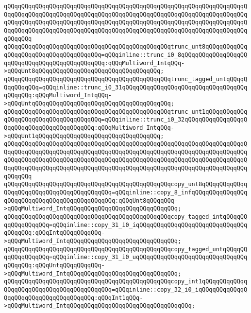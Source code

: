\verb|qQQqqQQqqQQqqQQqqQQqqQQqqQQqqQQqqQQqqQQqqQQqqQQqqQQqqQQqqQQqqQQqqQQqqQQqqQQqqQQqqQQqqQQqqQQqqQQqqQQqqQQqqQQqqQQqqQQqqQQqqQQqqQQqqQQqqQQqqQQqqQQqqQQqqQQqqQQqqQQqqQQqqQQqqQQqqQQqqQQqqQQqqQQqqQQqqQQqqQQqqQQqqQQqqQQqqQQqqQQqqQQqqQQqqQQqqQQqqQQqqQQqqQQqqQQqqQQqqQQqqQQqqQQqqQQqqQQqqQQqqQQqqQQq|\newline
\verb|qQQqqQQqqQQqqQQqqQQqqQQqqQQqqQQqqQQqqQQqqQQqqQQqtrunc_unt8qQQqqQQqqQQqqQQqqQQqqQQqqQQqqQQqqQQqqQQq=qQQqinline::trunc_i0_8qQQqqQQqqQQqqQQqqQQqqQQqqQQqqQQqqQQqqQQqqQQqqQQq:qQQqMultiword_IntqQQq->qQQqUnt8qQQqqQQqqQQqqQQqqQQqqQQqqQQqqQQqqQQq;|\newline
\verb|qQQqqQQqqQQqqQQqqQQqqQQqqQQqqQQqqQQqqQQqqQQqqQQqtrunc_tagged_untqQQqqQQqqQQqqQQq=qQQqinline::trunc_i0_31qQQqqQQqqQQqqQQqqQQqqQQqqQQqqQQqqQQqqQQqqQQq:qQQqMultiword_IntqQQq->qQQqUntqQQqqQQqqQQqqQQqqQQqqQQqqQQqqQQqqQQqqQQq;|\newline
\verb|qQQqqQQqqQQqqQQqqQQqqQQqqQQqqQQqqQQqqQQqqQQqqQQqtrunc_unt1qQQqqQQqqQQqqQQqqQQqqQQqqQQqqQQqqQQqqQQq=qQQqinline::trunc_i0_32qQQqqQQqqQQqqQQqqQQqqQQqqQQqqQQqqQQqqQQqqQQq:qQQqMultiword_IntqQQq->qQQqUnt1qQQqqQQqqQQqqQQqqQQqqQQqqQQqqQQqqQQq;|\newline
\verb|qQQqqQQqqQQqqQQqqQQqqQQqqQQqqQQqqQQqqQQqqQQqqQQqqQQqqQQqqQQqqQQqqQQqqQQqqQQqqQQqqQQqqQQqqQQqqQQqqQQqqQQqqQQqqQQqqQQqqQQqqQQqqQQqqQQqqQQqqQQqqQQqqQQqqQQqqQQqqQQqqQQqqQQqqQQqqQQqqQQqqQQqqQQqqQQqqQQqqQQqqQQqqQQqqQQqqQQqqQQqqQQqqQQqqQQqqQQqqQQqqQQqqQQqqQQqqQQqqQQqqQQqqQQqqQQqqQQqqQQqqQQqqQQq|\newline
\verb|qQQqqQQqqQQqqQQqqQQqqQQqqQQqqQQqqQQqqQQqqQQqqQQqcopy_unt8qQQqqQQqqQQqqQQqqQQqqQQqqQQqqQQqqQQqqQQqqQQq=qQQqinline::copy_8_infqQQqqQQqqQQqqQQqqQQqqQQqqQQqqQQqqQQqqQQqqQQqqQQq:qQQqUnt8qQQqqQQq->qQQqMultiword_IntqQQqqQQqqQQqqQQqqQQqqQQqqQQqqQQq;|\newline
\verb|qQQqqQQqqQQqqQQqqQQqqQQqqQQqqQQqqQQqqQQqqQQqqQQqcopy_tagged_intqQQqqQQqqQQqqQQqqQQq=qQQqinline::copy_31_i0_iqQQqqQQqqQQqqQQqqQQqqQQqqQQqqQQqqQQqqQQq:qQQqIntqQQqqQQqqQQq->qQQqMultiword_IntqQQqqQQqqQQqqQQqqQQqqQQqqQQqqQQq;|\newline
\verb|qQQqqQQqqQQqqQQqqQQqqQQqqQQqqQQqqQQqqQQqqQQqqQQqcopy_tagged_untqQQqqQQqqQQqqQQqqQQq=qQQqinline::copy_31_i0_uqQQqqQQqqQQqqQQqqQQqqQQqqQQqqQQqqQQqqQQq:qQQqUntqQQqqQQqqQQq->qQQqMultiword_IntqQQqqQQqqQQqqQQqqQQqqQQqqQQqqQQq;|\newline
\verb|qQQqqQQqqQQqqQQqqQQqqQQqqQQqqQQqqQQqqQQqqQQqqQQqcopy_int1qQQqqQQqqQQqqQQqqQQqqQQqqQQqqQQqqQQqqQQqqQQq=qQQqinline::copy_32_i0_iqQQqqQQqqQQqqQQqqQQqqQQqqQQqqQQqqQQqqQQq:qQQqInt1qQQq->qQQqMultiword_IntqQQqqQQqqQQqqQQqqQQqqQQqqQQqqQQqqQQq;|\newline
